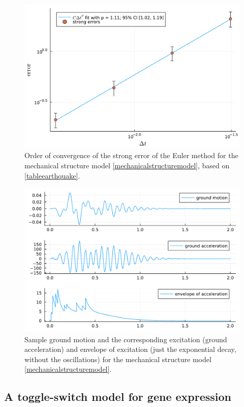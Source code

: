 \documentclass[reqno,12pt]{amsart}
\theoremstyle{plain} %
\theoremstyle{definition} %
\begin{document}
\begin{figure}[htb]
    \includegraphics[scale=0.6]{img/convergence_earthquake.pdf}
    \caption{Order of convergence of the strong error of the Euler method for the mechanical structure model \eqref{mechanicalstructuremodel}, based on \cref{tableearthquake}.}
    \label{figearthquake}
\end{figure}

\begin{figure}[htb]
    \includegraphics[scale=0.6]{img/noise_earthquake.pdf}
    \caption{Sample ground motion and the corresponding excitation (ground acceleration) and envelope of excitation (just the exponential decay, without the oscillations) for the mechanical structure model \eqref{mechanicalstructuremodel}.}
    \label{figearthquakenoise}
\end{figure}

\subsection{A toggle-switch model for gene expression}
\end{document}
